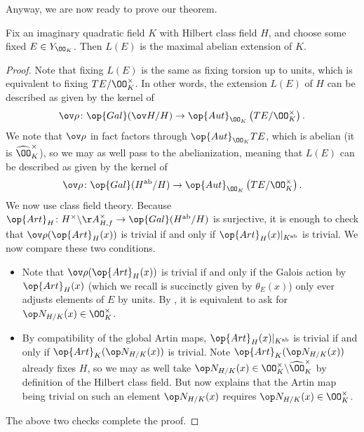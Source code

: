 \documentclass[../notes.tex]{subfiles}
\begin{document}
Anyway, we are now ready to prove our theorem.
\begin{theorem}
	Fix an imaginary quadratic field $K$ with Hilbert class field $H$, and choose some fixed $E\in Y_{\OO_K}$. Then $L(E)$ is the maximal abelian extension of $K$.
\end{theorem}
\begin{proof}
	Note that fixing $L(E)$ is the same as fixing torsion up to units, which is equivalent to fixing $TE/\OO_K^\times$. In other words, the extension $L(E)$ of $H$ can be described as given by the kernel of
	\[\ov\rho\colon\op{Gal}(\ov H/H)\to\op{Aut}_{\OO_K}\left(TE/\OO_K^\times\right).\]
	We note that $\ov\rho$ in fact factors through $\op{Aut}_{\OO_K}TE$, which is abelian (it is $\widehat\OO_K^\times$), so we may as well pass to the abelianization, meaning that $L(E)$ can be described as given by the kernel of
	\[\ov\rho\colon\op{Gal}(H^{\mathrm{ab}}/H)\to\op{Aut}_{\OO_K}\left(TE/\OO_K^\times\right).\]
	We now use class field theory. Because $\op{Art}_H\colon H^\times\backslash\AA_{H,f}^\times\to\op{Gal}(H^{\mathrm{ab}}/H)$ is surjective, it is enough to check that $\ov\rho(\op{Art}_H(x))$ is trivial if and only if $\op{Art}_H(x)|_{K^{\mathrm{ab}}}$ is trivial. We now compare these two conditions.
	\begin{itemize}
		\item Note that $\ov\rho(\op{Art}_H(x))$ is trivial if and only if the Galois action by $\op{Art}_H(x)$ (which we recall is succinctly given by $\theta_E(x)$) only ever adjusts elements of $E$ by units. By , it is equivalent to ask for $\op N_{H/K}(x)\in\OO_K^\times$.
		\item By compatibility of the global Artin maps, $\op{Art}_H(x)|_{K^{\mathrm{ab}}}$ is trivial if and only if $\op{Art}_K(\op N_{H/K}(x))$ is trivial. Note $\op{Art}_K(\op N_{H/K}(x))$ already fixes $H$, so we may as well take $\op N_{H/K}(x)\in\OO_K^\times\backslash\widehat\OO_K^\times$ by definition of the Hilbert class field. But now \cite[Corollary~8.2.2]{neukirch-cohom} explains that the Artin map being trivial on such an element $\op N_{H/K}(x)$ requires $\op N_{H/K}(x)\in\OO_K^\times$.
	\end{itemize}
	The above two checks complete the proof.
\end{proof}
\end{document}
